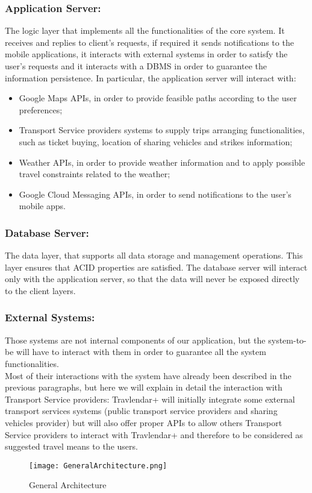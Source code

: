 \subsubsection{Application Server:}
\label{subsubsect:Application Server}
The logic layer that implements all the functionalities of the core system. It receives and replies to client's requests, if required it sends notifications to the mobile applications, it interacts with external systems in order to satisfy the user's requests and it interacts with a DBMS in order to guarantee the information persistence.
In particular, the application server will interact with:
\begin{itemize}
\item Google Maps APIs, in order to provide feasible paths according to the user preferences;
\item Transport Service providers systems to supply trips arranging functionalities, such as ticket buying, location of sharing vehicles and strikes information;
\item Weather APIs, in order to provide weather information and to apply possible travel constraints related to the weather;
\item Google Cloud Messaging APIs, in order to send notifications to the user's mobile apps.
\end{itemize} 
\subsubsection{Database Server:}
\label{subsubsect:Database Server}
The data layer, that supports all data storage and management operations. This layer ensures that ACID properties are satisfied. The database server will interact only with the application server, so that the data will never be exposed directly to the client layers.
\subsubsection{External Systems:}
\label{subsubsect:External Systems}
Those systems are not internal components of our application, but the system-to-be will have to interact with them in order to guarantee all the system functionalities. \\
Most of their interactions with the system have already been described in the previous paragraphs, but here we will explain in detail the interaction with Transport Service providers: Travlendar+ will initially integrate some external transport services systems (public transport service providers and sharing vehicles provider) but will also offer proper APIs to allow others Transport Service providers to interact with Travlendar+ and therefore to be considered as suggested travel means to the users.


\begin{figure}[H]
\begin{center}
		\hspace*{-50pt}
		\texttt{[image: GeneralArchitecture.png]}
\end{center}
\caption{General Architecture}
\end{figure}
